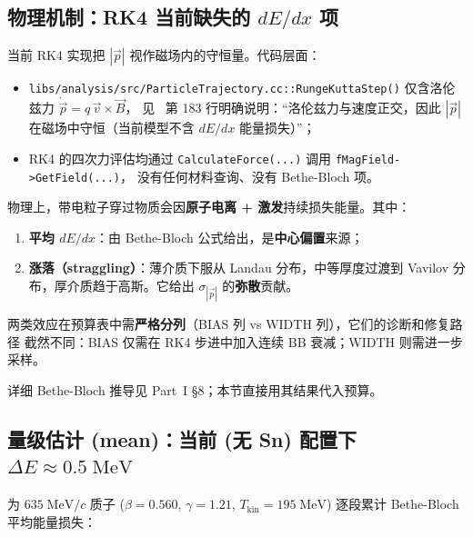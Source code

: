 \subsection{物理机制：RK4 当前缺失的 \texorpdfstring{$dE/dx$}{dE/dx} 项}
\label{sec:budget-dedx-mechanism}

当前 RK4 实现把 $|\vec p|$ 视作磁场内的守恒量。代码层面：
\begin{itemize}
  \item \texttt{libs/analysis/src/ParticleTrajectory.cc::RungeKuttaStep()} 仅含洛伦兹力
        \(\dot{\vec p} = q\,\vec v\times\vec B\)，
        见 \StatusReport{}~第 183 行明确说明：``洛伦兹力与速度正交，因此 $|\vec p|$
        在磁场中守恒（当前模型不含 $dE/dx$ 能量损失）''；
  \item RK4 的四次力评估均通过 \texttt{CalculateForce(...)} 调用 \texttt{fMagField->GetField(...)}，
        没有任何材料查询、没有 Bethe-Bloch 项。
\end{itemize}

物理上，带电粒子穿过物质会因\textbf{原子电离 + 激发}持续损失能量。其中：
\begin{enumerate}
  \item \textbf{平均 $dE/dx$}：由 Bethe-Bloch 公式给出，是\textbf{中心偏置}来源；
  \item \textbf{涨落（straggling）}：薄介质下服从 Landau 分布，中等厚度过渡到 Vavilov
        分布，厚介质趋于高斯。它给出 $\sigma_{|\vec p|}$ 的\textbf{弥散}贡献。
\end{enumerate}
两类效应在预算表中需\textbf{严格分列}（BIAS 列 vs WIDTH 列），它们的诊断和修复路径
截然不同：BIAS 仅需在 RK4 步进中加入连续 BB 衰减；WIDTH 则需进一步采样。

详细 Bethe-Bloch 推导见 Part~I §8；本节直接用其结果代入预算。

\subsection{量级估计 (mean)：当前 (无 Sn) 配置下 $\Delta E \approx 0.5\;\mathrm{MeV}$}
\label{sec:budget-dedx-magnitude-mean}

为 $635\;\mathrm{MeV}/c$ 质子 ($\beta = 0.560$, $\gamma = 1.21$, $T_\mathrm{kin} = 195\;\mathrm{MeV}$)
逐段累计 Bethe-Bloch 平均能量损失：

